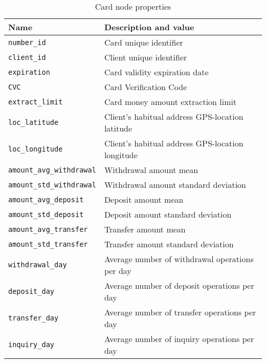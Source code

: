 \begin{table}[H]
    \centering
    \begin{tabular}{|l|l|}
    \hline
    \textbf{Name}        & \textbf{Description and value}                                          \\ \hline
    \texttt{number\_id}   & Card unique identifier                               \\ \hline
    \texttt{client\_id}   & Client unique identifier                               \\ \hline
    \texttt{expiration}   & Card validity expiration date                      \\ \hline
    \texttt{CVC}          & Card Verification Code                                      \\ \hline
    \texttt{extract\_limit} & Card money amount extraction limit    \\ \hline
    \texttt{loc\_latitude}  & Client's habitual address GPS-location latitude                         \\ \hline
    \texttt{loc\_longitude} & Client's habitual address GPS-location longitude                        \\ \hline
    \texttt{amount\_avg\_withdrawal} & Withdrawal amount mean\\ 
    \hline
    \texttt{amount\_std\_withdrawal} & Withdrawal amount standard deviation \\ 
    \hline
    \texttt{amount\_avg\_deposit} & Deposit amount mean \\ 
    \hline
    \texttt{amount\_std\_deposit} & Deposit amount standard deviation\\ 
    \hline
    \texttt{amount\_avg\_transfer} & Transfer amount mean \\ 
    \hline
    \texttt{amount\_std\_transfer} & Transfer amount standard deviation \\ 
    \hline
    \texttt{withdrawal\_day} & Average number of withdrawal operations per day \\ 
    \hline
    \texttt{deposit\_day} & Average number of deposit operations per day \\ 
    \hline
    \texttt{transfer\_day} & Average number of transfer operations per day \\ 
    \hline
    \texttt{inquiry\_day} & Average number of inquiry operations per day \\ 
    \hline
    \end{tabular}
    \caption{Card node properties}
    \label{table:card-node-properties}
\end{table}